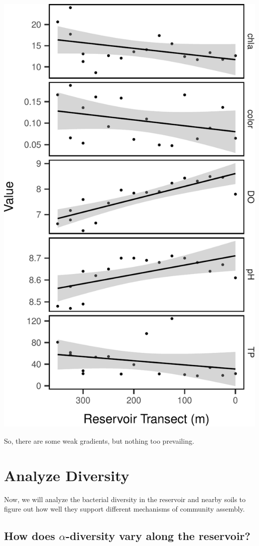 \documentclass[]{article}
\begin{document}
\begin{center}\includegraphics[width=0.7\linewidth]{ReservoirGradient_files/figure-latex/env_plot-1} \end{center}

So, there are some weak gradients, but nothing too prevailing.

\section{Analyze Diversity}\label{analyze-diversity}

Now, we will analyze the bacterial diversity in the reservoir and nearby
soils to figure out how well they support different mechanisms of
community assembly.

\subsection{\texorpdfstring{How does \(\alpha\)-diversity vary along the
reservoir?}{How does \textbackslash{}alpha-diversity vary along the reservoir?}}\label{how-does-alpha-diversity-vary-along-the-reservoir}
\end{document}
